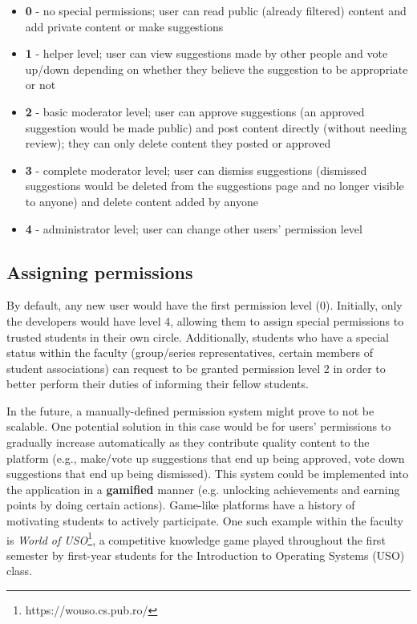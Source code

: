 \begin{itemize}
    \setlength{\topsep}{0.5pt}
    \setlength{\itemsep}{0.5pt}
    \setlength{\parsep}{0.5pt}
    \item \textbf{0} - no special permissions; user can read public (already filtered) content and add private content or make suggestions
    \item \textbf{1} - helper level; user can view suggestions made by other people and vote up/down depending on whether they believe the suggestion to be appropriate or not
    \item \textbf{2} - basic moderator level; user can approve suggestions (an approved suggestion would be made public) and post content directly (without needing review); they can only delete content they posted or approved
    \item \textbf{3} - complete moderator level; user can dismiss suggestions (dismissed suggestions would be deleted from the suggestions page and no longer visible to anyone) and delete content added by anyone
    \item \textbf{4} - administrator level; user can change other users' permission level
\end{itemize}

\subsection{Assigning permissions} \label{4:permissions_assigning}

By default, any new user would have the first permission level (0). Initially, only the developers would have level 4, allowing them to assign special permissions to trusted students in their own circle. Additionally, students who have a special status within the faculty (group/series representatives, certain members of student associations) can request to be granted permission level 2 in order to better perform their duties of informing their fellow students.

In the future, a manually-defined permission system might prove to not be scalable. One potential solution in this case would be for users' permissions to gradually increase automatically as they contribute quality content to the platform (e.g., make/vote up suggestions that end up being approved, vote down suggestions that end up being dismissed). This system could be implemented into the application in a \textbf{gamified} manner (e.g. unlocking achievements and earning points by doing certain actions). Game-like platforms have a history of motivating students to actively participate. One such example within the faculty is \textit{World of USO}\footnote{https://wouso.cs.pub.ro/}, a competitive knowledge game played throughout the first semester by first-year students for the Introduction to Operating Systems (USO) class.

